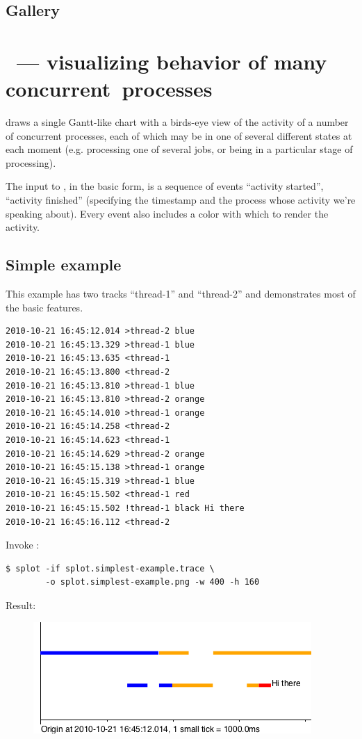 \documentclass{article}
\begin{document}
\pagebreak
\subsection{Gallery}
\label{sec:tplot-gallery}

\pagebreak
\section{\splot{} ~--- visualizing behavior of many \mbox{concurrent processes}}

\splot{} draws a single Gantt-like chart with a birds-eye view of the activity of a number of concurrent processes, each of which may be in one of several different states at each moment (e.g. processing one of several jobs, or being in a particular stage of processing). 

The input to \splot{}, in the basic form, is a sequence of events ``activity started'', ``activity finished'' (specifying the timestamp and the process whose activity we're speaking about). Every event also includes a color with which to render the activity.

\subsection{Simple example}

This example has two tracks ``thread-1'' and ``thread-2'' and demonstrates most of the basic features.

\begin{verbatim}
2010-10-21 16:45:12.014 >thread-2 blue
2010-10-21 16:45:13.329 >thread-1 blue
2010-10-21 16:45:13.635 <thread-1
2010-10-21 16:45:13.800 <thread-2
2010-10-21 16:45:13.810 >thread-1 blue
2010-10-21 16:45:13.810 >thread-2 orange
2010-10-21 16:45:14.010 >thread-1 orange
2010-10-21 16:45:14.258 <thread-2
2010-10-21 16:45:14.623 <thread-1
2010-10-21 16:45:14.629 >thread-2 orange
2010-10-21 16:45:15.138 >thread-1 orange
2010-10-21 16:45:15.319 >thread-1 blue
2010-10-21 16:45:15.502 <thread-1 red
2010-10-21 16:45:15.502 !thread-1 black Hi there
2010-10-21 16:45:16.112 <thread-2
\end{verbatim}

Invoke \splot{}:
\begin{verbatim}
$ splot -if splot.simplest-example.trace \
        -o splot.simplest-example.png -w 400 -h 160
\end{verbatim}

Result:
\begin{figure}[h]
\center
\includegraphics[scale=0.5]{pics/splot/splot-simplest-example.png}
\end{figure}
\end{document}
